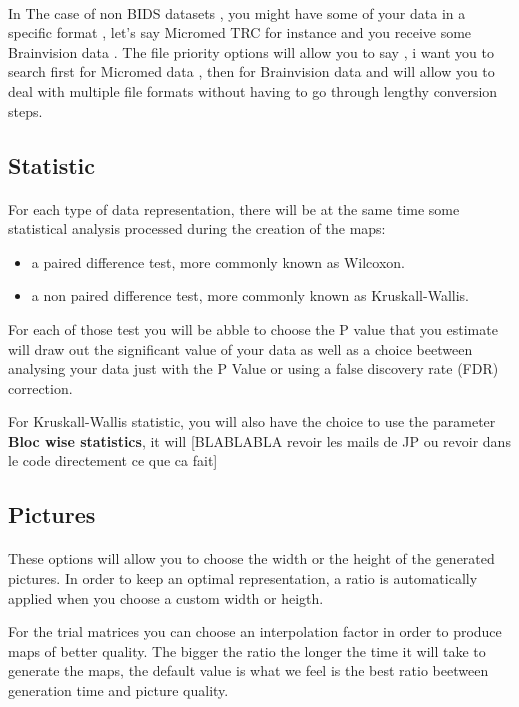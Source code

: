 \documentclass[a4paper]{article}
\begin{document}
\paragraph{} In The case of non BIDS datasets , you might have some of your data in a specific format , let's say Micromed TRC for instance and you receive some Brainvision data . The file priority options will allow you to say , i want you to search first for Micromed data , then for Brainvision data and will allow you to deal with multiple file formats without having to go through lengthy conversion steps.
\subsection{Statistic}
\paragraph{} For each type of data representation, there will be at the same time some statistical analysis processed during the creation of the maps:

\begin{itemize}
\item a paired difference test,  more commonly known as Wilcoxon.
\item a non paired difference test,  more commonly known as Kruskall-Wallis.
\end{itemize}

For each of those test you will be abble to choose the P value that you estimate will draw out the significant value of your data as well as a choice beetween analysing your data just with the P Value or using a false discovery rate (FDR) correction.

For Kruskall-Wallis statistic, you will also have the choice to use the parameter \textbf{Bloc wise statistics},  it will [BLABLABLA revoir les mails de JP ou revoir dans le code directement ce que ca fait]
\subsection{Pictures}
\paragraph{} These options will allow you to choose the width or the height of the generated pictures. In order to keep an optimal representation, a ratio is automatically applied when you choose a custom width or heigth.

For the trial matrices you can choose an interpolation factor in order to produce maps of better quality. The bigger the ratio the longer the time it will take to generate the maps, the default value is what we feel is the best ratio beetween generation time and picture quality.
\end{document}
